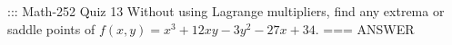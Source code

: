 ::: Math-252 Quiz 13
Without using Lagrange multipliers, find any extrema or saddle points of
\(f(x,y)=x^3+12xy-3y^2-27x+34\).
===
ANSWER
